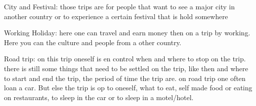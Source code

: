 City and Festival:
those trips are for people that want to see a major city in another country or to experience a certain festival that is hold somewhere 

Working Holiday:
here one can travel and earn money then on a trip by working. Here you can the culture and people from a other country. 

Road trip:
on this trip oneself is en control when and where to stop on the trip. there is still some things that need to be settled on the trip, like then and where to start and end the trip, the period of time the trip are. on road trip one often loan a car. But else the trip is op to oneself, what to eat, self made food or eating on restaurants, to sleep in the car or to sleep in a motel/hotel.